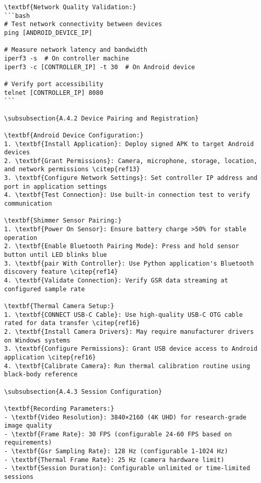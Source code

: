 \begin{verbatim}
\textbf{Network Quality Validation:}
```bash
# Test network connectivity between devices
ping [ANDROID_DEVICE_IP]

# Measure network latency and bandwidth
iperf3 -s  # On controller machine
iperf3 -c [CONTROLLER_IP] -t 30  # On Android device

# Verify port accessibility
telnet [CONTROLLER_IP] 8080
```

\subsubsection{A.4.2 Device Pairing and Registration}

\textbf{Android Device Configuration:}
1. \textbf{Install Application}: Deploy signed APK to target Android devices
2. \textbf{Grant Permissions}: Camera, microphone, storage, location, and network permissions \citep{ref13}
3. \textbf{Configure Network Settings}: Set controller IP address and port in application settings
4. \textbf{Test Connection}: Use built-in connection test to verify communication

\textbf{Shimmer Sensor Pairing:}
1. \textbf{Power On Sensor}: Ensure battery charge >50% for stable operation
2. \textbf{Enable Bluetooth Pairing Mode}: Press and hold sensor button until LED blinks blue
3. \textbf{pair With Controller}: Use Python application's Bluetooth discovery feature \citep{ref14}
4. \textbf{Validate Connection}: Verify GSR data streaming at configured sample rate

\textbf{Thermal Camera Setup:}
1. \textbf{CONNECT USB-C Cable}: Use high-quality USB-C OTG cable rated for data transfer \citep{ref16}
2. \textbf{Install Camera Drivers}: May require manufacturer drivers on Windows systems
3. \textbf{Configure Permissions}: Grant USB device access to Android application \citep{ref16}
4. \textbf{Calibrate Camera}: Run thermal calibration routine using black-body reference

\subsubsection{A.4.3 Session Configuration}

\textbf{Recording Parameters:}
- \textbf{Video Resolution}: 3840×2160 (4K UHD) for research-grade image quality
- \textbf{Frame Rate}: 30 FPS (configurable 24-60 FPS based on requirements)
- \textbf{Gsr Sampling Rate}: 128 Hz (configurable 1-1024 Hz)
- \textbf{Thermal Frame Rate}: 25 Hz (camera hardware limit)
- \textbf{Session Duration}: Configurable unlimited or time-limited sessions


\end{verbatim}
